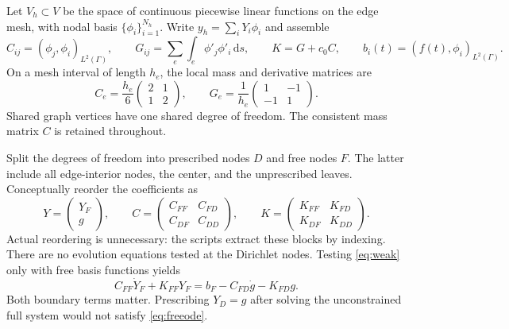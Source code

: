\documentclass[11pt,a4paper]{article}
\newcommand{\G}{\Gamma}
\newcommand{\ip}[2]{\left(#1,#2\right)_{L^2(\G)}}
\newcommand{\dd}{\,\mathrm d}
\begin{document}
Let $V_h\subset V$ be the space of continuous piecewise linear functions
on the edge mesh, with nodal basis $\{\phi_i\}_{i=1}^{N_h}$. Write
$y_h=\sum_iY_i\phi_i$ and assemble
\begin{equation}\label{eq:matrices}
 C_{ij}=\ip{\phi_j}{\phi_i},\qquad
 G_{ij}=\sum_e\int_e\phi'_j\phi'_i\dd s,\qquad
 K=G+c_0C,\qquad b_i(t)=\ip{f(t)}{\phi_i}.
\end{equation}
On a mesh interval of length $h_e$, the local mass and derivative
matrices are
\[
 C_e=\frac{h_e}{6}\begin{pmatrix}2&1\\1&2\end{pmatrix},
 \qquad
 G_e=\frac1{h_e}\begin{pmatrix}1&-1\\-1&1\end{pmatrix}.
\]
Shared graph vertices have one shared degree of freedom.
The consistent mass matrix $C$ is retained throughout.

Split the degrees of freedom into prescribed nodes $D$ and free nodes
$F$. The latter include all edge-interior nodes, the center, and the
unprescribed leaves. Conceptually reorder the coefficients as
\[
 Y=\begin{pmatrix}Y_F\\g\end{pmatrix},\qquad
 C=\begin{pmatrix}C_{FF}&C_{FD}\\C_{DF}&C_{DD}\end{pmatrix},
 \qquad
 K=\begin{pmatrix}K_{FF}&K_{FD}\\K_{DF}&K_{DD}\end{pmatrix}.
\]
Actual reordering is unnecessary: the scripts extract these blocks by
indexing. There are no evolution equations tested at the Dirichlet nodes.
Testing \eqref{eq:weak} only with free basis functions yields
\begin{equation}\label{eq:freeode}
 C_{FF}\dot Y_F+K_{FF}Y_F
   =b_F-C_{FD}\dot g-K_{FD}g.
\end{equation}
Both boundary terms matter. Prescribing $Y_D=g$ after solving the
unconstrained full system would not satisfy \eqref{eq:freeode}.
\end{document}
